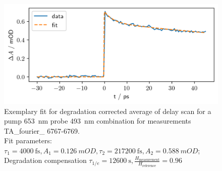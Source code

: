 \documentclass[twoside,openright,listof=numbered]{scrreprt}
\begin{document}
\begin{figure}[hbtp]
\centering
\includegraphics[scale=1]{images/ExemplaryDelayScanFit_Pump653Probe493.png}
\caption[Exemplary fit for degradation corrected average of delay scan for a pump \SI{653}{\nano\meter} probe \SI{493}{\nano\meter} combination for measurements TA\_fourier\_ 6767-6769.]{Exemplary fit for degradation corrected average of delay scan for a pump \SI{653}{\nano\meter} probe \SI{493}{\nano\meter} combination for measurements TA\_fourier\_ 6767-6769.\\Fit parameters: $\tau_1 = \SI{4000}{\femto\second}, A_1 = \SI{0.126}{mOD}, \tau_2 = \SI{217200}{\femto\second}, A_2 = \SI{0.588}{mOD}$; Degradation compensation $\tau_{1/e} = \SI{12600}{\second}, \frac{H_\mathrm{measurement}}{H_\mathrm{reference}} = 0.96$ \label{fig:delayFitExample}}
\end{figure}
\end{document}
